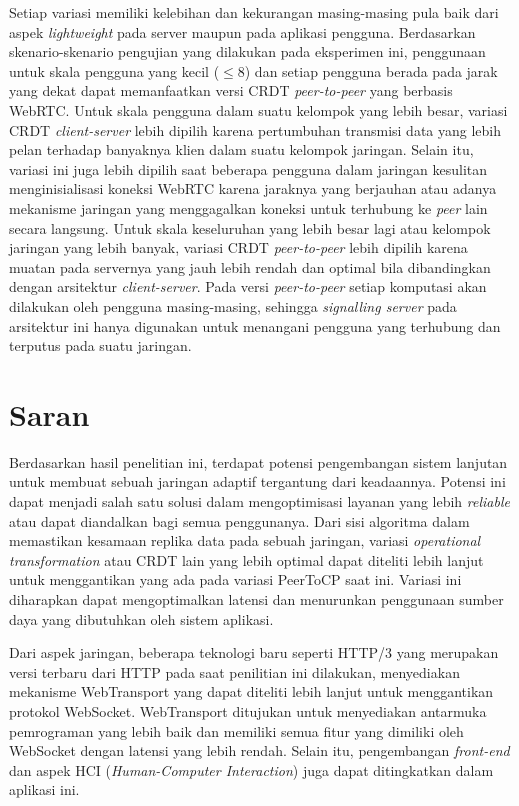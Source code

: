 Setiap variasi memiliki kelebihan dan kekurangan masing-masing pula baik dari aspek \textit{lightweight} pada server maupun pada aplikasi pengguna. Berdasarkan skenario-skenario pengujian yang dilakukan pada eksperimen ini, penggunaan untuk skala pengguna yang kecil ($\leq 8$) dan setiap pengguna berada pada jarak yang dekat dapat memanfaatkan versi CRDT \textit{peer-to-peer} yang berbasis WebRTC. Untuk skala pengguna dalam suatu kelompok yang lebih besar, variasi CRDT \textit{client-server} lebih dipilih karena pertumbuhan transmisi data yang lebih pelan terhadap banyaknya klien dalam suatu kelompok jaringan. Selain itu, variasi ini juga lebih dipilih saat beberapa pengguna dalam jaringan kesulitan menginisialisasi koneksi WebRTC karena jaraknya yang berjauhan atau adanya mekanisme jaringan yang menggagalkan koneksi untuk terhubung ke \textit{peer} lain secara langsung. Untuk skala keseluruhan yang lebih besar lagi atau kelompok jaringan yang lebih banyak, variasi CRDT \textit{peer-to-peer} lebih dipilih karena muatan pada servernya yang jauh lebih rendah dan optimal bila dibandingkan dengan arsitektur \textit{client-server}. Pada versi \textit{peer-to-peer} setiap komputasi akan dilakukan oleh pengguna masing-masing, sehingga \textit{signalling server} pada arsitektur ini hanya digunakan untuk menangani pengguna yang terhubung dan terputus pada suatu jaringan.

\section{Saran}
\label{sec:saran}

Berdasarkan hasil penelitian ini, terdapat potensi pengembangan sistem lanjutan untuk membuat sebuah jaringan adaptif tergantung dari keadaannya. Potensi ini dapat menjadi salah satu solusi dalam mengoptimisasi layanan yang lebih \textit{reliable} atau dapat diandalkan bagi semua penggunanya. Dari sisi algoritma dalam memastikan kesamaan replika data pada sebuah jaringan, variasi \textit{operational transformation} atau CRDT lain yang lebih optimal dapat diteliti lebih lanjut untuk menggantikan yang ada pada variasi PeerToCP saat ini. Variasi ini diharapkan dapat mengoptimalkan latensi dan menurunkan penggunaan sumber daya yang dibutuhkan oleh sistem aplikasi.

Dari aspek jaringan, beberapa teknologi baru seperti HTTP/3 yang merupakan versi terbaru dari HTTP pada saat penilitian ini dilakukan, menyediakan mekanisme WebTransport yang dapat diteliti lebih lanjut untuk menggantikan protokol WebSocket. WebTransport ditujukan untuk menyediakan antarmuka pemrograman yang lebih baik dan memiliki semua fitur yang dimiliki oleh WebSocket dengan latensi yang lebih rendah. Selain itu, pengembangan \textit{front-end} dan aspek HCI (\textit{Human-Computer Interaction}) juga dapat ditingkatkan dalam aplikasi ini.

